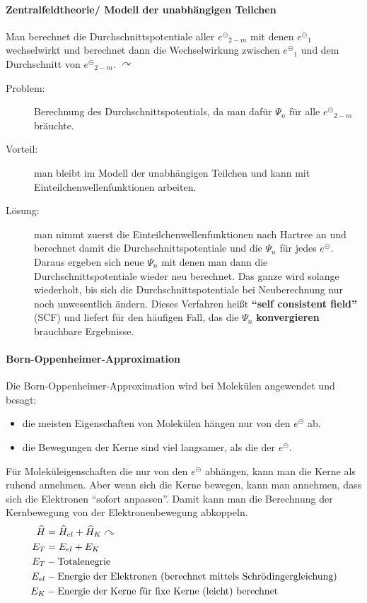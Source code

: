\documentclass[12pt,a4paper,oneside,normalheadings,abstracton,liststotoc,bibtotoc,titlepage,pdftex]{scrartcl}
\begin{document}
\paragraph{Zentralfeldtheorie/ Modell der unabhängigen Teilchen}
Man berechnet die Durchschnittspotentiale aller ${e^\circleddash}_{2-m}$ mit denen ${e^\circleddash}_1$ wechselwirkt und berechnet dann die Wechselwirkung zwischen ${e^\circleddash}_1$ und dem Durchschnitt von ${e^\circleddash}_{2-m}$. $\curvearrowright$ \\
\begin{description}
\item[Problem:] Berechnung des Durchschnittspotentials, da man dafür $\Psi_n$ für alle ${e^\circleddash}_{2-m}$ bräuchte.
\item[Vorteil:] man bleibt im Modell der unabhängigen Teilchen und kann mit Einteilchenwellenfunktionen arbeiten.
\item[Lösung:] man nimmt zuerst die Einteilchenwellenfunktionen nach Hartree an und berechnet damit die Durchschnittspotentiale und die $\Psi_n$ für jedes ${e^\circleddash}$. Daraus ergeben sich neue $\Psi_n$ mit denen man dann die Durchschnittspotentiale wieder neu berechnet. Das ganze wird solange wiederholt, bis sich die Durchschnittspotentiale bei Neuberechnung nur noch unwesentlich ändern. Dieses Verfahren heißt \textbf{``self consistent field''} (SCF) und liefert für den häufigen Fall, das die $\Psi_n$ \textbf{konvergieren} brauchbare Ergebnisse.
\end{description}
\paragraph{Born-Oppenheimer-Approximation}
Die Born-Oppenheimer-Approximation wird bei Molekülen angewendet und besagt:
\begin{itemize}
\item die meisten Eigenschaften von Molekülen hängen nur von den ${e^\circleddash}$ ab.
\item die Bewegungen der Kerne sind viel langsamer, als die der ${e^\circleddash}$.
\end{itemize}
Für Moleküleigenschaften die nur von den ${e^\circleddash}$ abhängen, kann man die Kerne als ruhend annehmen. Aber wenn sich die Kerne bewegen, kann man annehmen, dass sich die Elektronen ``sofort anpassen''. Damit kann man die Berechnung der Kernbewegung von der Elektronenbewegung abkoppeln.
\begin{align}
\widehat{H} &= \widehat{H}_{el} + \widehat{H}_K \curvearrowright\\
E_T&=E_{el}+E_K \\
\notag E_T &- \text{Totalenegrie}\\
\notag E_{el} &- \text{Energie der Elektronen (berechnet mittels Schrödingergleichung)}\\
\notag E_K &- \text{Energie der Kerne für fixe Kerne (leicht) berechnet}
\end{align}
\end{document}
